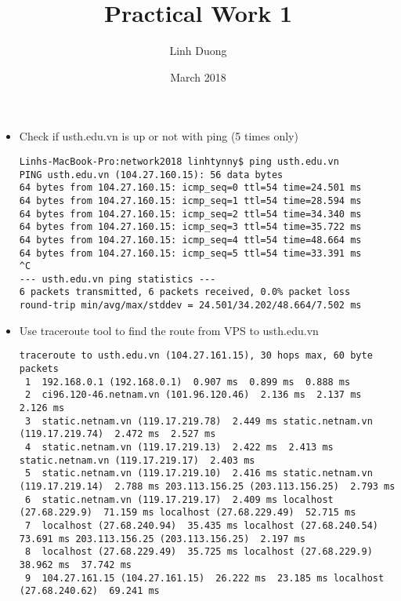 \documentclass{article}
\title{Practical Work 1}
\author{Linh Duong}
\date{March 2018}
\begin{document}
\maketitle

\bigskip

\begin{itemize}
    \item Check if usth.edu.vn is up or not with ping (5 times only)

\begin{verbatim}
Linhs-MacBook-Pro:network2018 linhtynny$ ping usth.edu.vn
PING usth.edu.vn (104.27.160.15): 56 data bytes
64 bytes from 104.27.160.15: icmp_seq=0 ttl=54 time=24.501 ms
64 bytes from 104.27.160.15: icmp_seq=1 ttl=54 time=28.594 ms
64 bytes from 104.27.160.15: icmp_seq=2 ttl=54 time=34.340 ms
64 bytes from 104.27.160.15: icmp_seq=3 ttl=54 time=35.722 ms
64 bytes from 104.27.160.15: icmp_seq=4 ttl=54 time=48.664 ms
64 bytes from 104.27.160.15: icmp_seq=5 ttl=54 time=33.391 ms
^C
--- usth.edu.vn ping statistics ---
6 packets transmitted, 6 packets received, 0.0% packet loss
round-trip min/avg/max/stddev = 24.501/34.202/48.664/7.502 ms
\end{verbatim}

\bigskip


 \item Use traceroute tool to find the route from VPS to usth.edu.vn
 
\begin{verbatim}
traceroute to usth.edu.vn (104.27.161.15), 30 hops max, 60 byte packets
 1  192.168.0.1 (192.168.0.1)  0.907 ms  0.899 ms  0.888 ms
 2  ci96.120-46.netnam.vn (101.96.120.46)  2.136 ms  2.137 ms  2.126 ms
 3  static.netnam.vn (119.17.219.78)  2.449 ms static.netnam.vn (119.17.219.74)  2.472 ms  2.527 ms
 4  static.netnam.vn (119.17.219.13)  2.422 ms  2.413 ms static.netnam.vn (119.17.219.17)  2.403 ms
 5  static.netnam.vn (119.17.219.10)  2.416 ms static.netnam.vn (119.17.219.14)  2.788 ms 203.113.156.25 (203.113.156.25)  2.793 ms
 6  static.netnam.vn (119.17.219.17)  2.409 ms localhost (27.68.229.9)  71.159 ms localhost (27.68.229.49)  52.715 ms
 7  localhost (27.68.240.94)  35.435 ms localhost (27.68.240.54)  73.691 ms 203.113.156.25 (203.113.156.25)  2.197 ms
 8  localhost (27.68.229.49)  35.725 ms localhost (27.68.229.9)  38.962 ms  37.742 ms
 9  104.27.161.15 (104.27.161.15)  26.222 ms  23.185 ms localhost (27.68.240.62)  69.241 ms


\end{verbatim}
\end{itemize}
\end{document}
